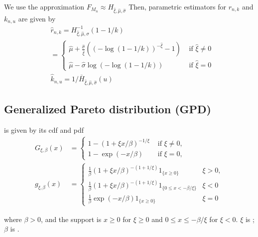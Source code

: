 We use the approximation
$
F_{M_{n}} \approx H_{\hat{\xi}, \hat{\mu}, \hat{\sigma}}
$
Then, parametric estimators for $r_{n, k}$ and $k_{n, u}$ are given by
$$
\begin{aligned}
&\hat{r}_{n, k}=H_{\hat{\xi}, \hat{\mu}, \hat{\sigma}}^{-1}(1-1 / k) \\
&= \begin{cases}\hat{\mu}+\frac{\hat{\sigma}}{\hat{\xi}}\left((-\log (1-1 / k))^{-\hat{\xi}}-1\right) & \text { if } \hat{\xi} \neq 0 \\
\hat{\mu}-\hat{\sigma} \log (-\log (1-1 / k)) & \text { if } \hat{\xi}=0\end{cases} \\
&\hat{k}_{n, u}=1 / \bar{H}_{\hat{\xi}, \hat{\mu}, \hat{\sigma}}(u)
\end{aligned}
$$











\subsection*{Generalized Pareto distribution (GPD)}
 is given by its cdf and pdf
$$
\begin{aligned}
G_{\xi, \beta}(x)&= \begin{cases}1-(1+\xi x / \beta)^{-1 / \xi} & \text { if } \xi \neq 0, \\ 1-\exp (-x / \beta) & \text { if } \xi=0,\end{cases} \\
g_{\xi, \beta}(x)&= \begin{cases}\frac{1}{\beta}(1+\xi x / \beta)^{-(1+1 / \xi)} 1_{\{x \geq 0\}} & \xi>0, \\ \frac{1}{\beta}(1+\xi x / \beta)^{-(1+1 / \xi)} 1_{\{0 \leq x<-\beta / \xi\}} & \xi<0 \\ \frac{1}{\beta} \exp (-x / \beta) 1_{\{x \geq 0\}} & \xi=0\end{cases}
\end{aligned}
$$

where $\beta>0$, and the support is $x \geq 0$ for $\xi \geq 0$ and $0 \leq x \leq-\beta / \xi$ for $\xi<0$.
$\xi$ is ; $\beta$ is .


